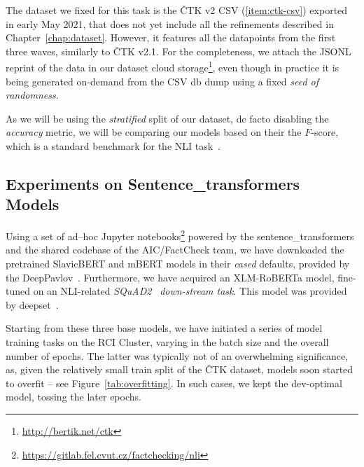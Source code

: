 The dataset we fixed for this task is the \textsf{ČTK v2 CSV} (\ref{item:ctk-csv}) exported in early May 2021, that does not yet include all the refinements described in Chapter~\ref{chap:dataset}. However, it features all the datapoints from the first three waves, similarly to \textsf{ČTK v2.1}. For the completeness, we attach the \textsf{JSONL} reprint of the data in our dataset cloud storage\footnote{\url{http://bertik.net/ctk}}, even though in practice it is being generated on-demand from the \textsf{CSV db} dump using a fixed\textit{ seed of randomness}. 

As we will be using the \textit{stratified} split of our dataset, de facto disabling the \textit{accuracy} metric, we will be comparing our models based on their the $F$-score, which is a standard benchmark for the NLI task~\cite{poliak}.

\subsection{Experiments on Sentence\_transformers Models}
\label{sec:expts}
Using a set of ad--hoc \textsf{Jupyter} notebooks\footnote{\url{https://gitlab.fel.cvut.cz/factchecking/nli}} powered by the \textsf{sentence\_transformers} and the shared codebase of the \textsf{AIC/FactCheck} team, we have downloaded the pretrained \textsf{SlavicBERT} and \textsf{mBERT} models in their \textit{cased} defaults, provided by the \textsf{DeepPavlov}~\cite{deeppavlov}. Furthermore, we have acquired an \textsf{XLM-RoBERTa} model, fine-tuned on an NLI-related \textit{SQuAD2}~\cite{squad} \textit{down-stream task}. This model was provided by \textsf{deepset}~\cite{deepset}.



Starting from these three base models, we have initiated a series of model training tasks on the \textsf{RCI Cluster}, varying in the batch size and the overall number of epochs. The latter was typically not of an overwhelming significance, as, given the relatively small \textsf{train} split of the \textsf{ČTK} dataset, models soon started to overfit -- see Figure~\ref{tab:overfitting}. In such cases, we kept the \textsf{dev}-optimal model, tossing the later epochs.


